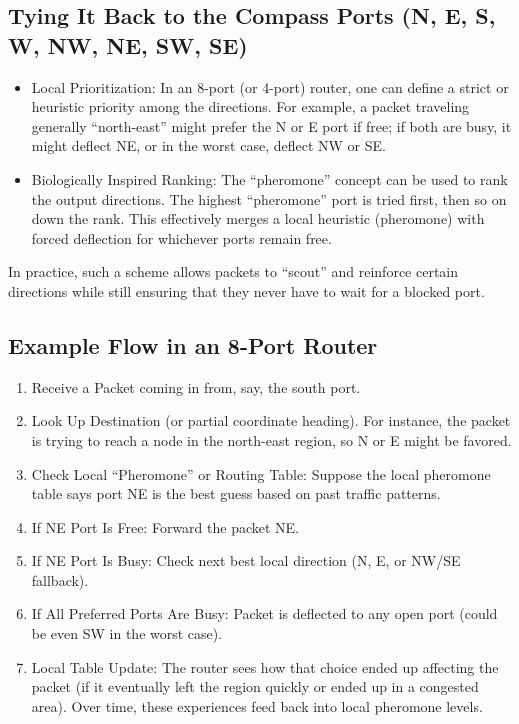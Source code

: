 \subsection{Tying It Back to the Compass Ports (N, E, S, W, NW, NE, SW, SE)}
%
\begin{itemize}
\item Local Prioritization: In an 8-port (or 4-port) router, one can define a strict or heuristic priority among the directions. For example, a packet traveling generally “north-east” might prefer the N or E port if free; if both are busy, it might deflect NE, or in the worst case, deflect NW or SE.
\item Biologically Inspired Ranking: The “pheromone” concept can be used to rank the output directions. The highest “pheromone” port is tried first, then so on down the rank. This effectively merges a local heuristic (pheromone) with forced deflection for whichever ports remain free.
\end{itemize}

In practice, such a scheme allows packets to “scout” and reinforce certain directions while still ensuring that they never have to wait for a blocked port.

\subsection{Example Flow in an 8-Port Router}

\begin{enumerate}
\item		Receive a Packet coming in from, say, the south port.
\item		Look Up Destination (or partial coordinate heading). For instance, the packet is trying to reach a node in the north-east region, so N or E might be favored.
\item		Check Local “Pheromone” or Routing Table: Suppose the local pheromone table says port NE is the best guess based on past traffic patterns.
\item		If NE Port Is Free: Forward the packet NE.
\item		If NE Port Is Busy: Check next best local direction (N, E, or NW/SE fallback).
\item		If All Preferred Ports Are Busy: Packet is deflected to any open port (could be even SW in the worst case).
\item		Local Table Update: The router sees how that choice ended up affecting the packet (if it eventually left the region quickly or ended up in a congested area). Over time, these experiences feed back into local pheromone levels.
\end{enumerate}

